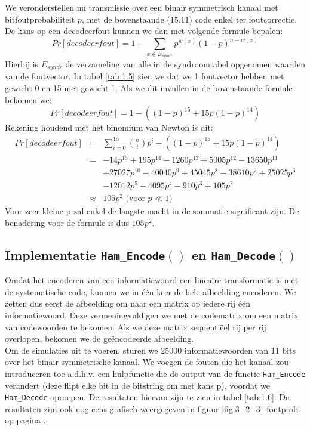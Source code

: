 \documentclass[11pt,a4paper]{article}
\begin{document}
We veronderstellen nu transmissie over een binair symmetrisch kanaal met bitfoutprobabiliteit $p$, met de bovenstaande (15,11) code enkel ter foutcorrectie. De kans op een decodeerfout kunnen we dan met volgende formule bepalen:\\
\begin{equation*}
Pr[decodeerfout] = 1 - \sum_{x \in E_{syndr}} p^{w(x)}(1-p)^{n-w(x)}
\end{equation*} 
Hierbij is $E_{syndr}$ de verzameling van alle in de syndroomtabel opgenomen waarden van de foutvector. In tabel \ref{tab:1.5} zien we dat we 1 foutvector hebben met gewicht 0 en 15 met gewicht 1. Als we dit invullen in de bovenstaande formule bekomen we:
\begin{equation*}
Pr[decodeerfout] = 1 - ((1-p)^{15}+15p(1-p)^{14})
\end{equation*} 
Rekening houdend met het binomium van Newton is dit:
\begin{eqnarray*}
Pr[decodeerfout] &=& \sum_{i=0}^{15} {n \choose i} p^i - ((1-p)^{15}+15p(1-p)^{14})\\
&=& -14p^{15} + 195p^{14} - 1260p^{13} + 5005p^{12} - 13650p^{11}\\
& &	 + 27027p^{10} - 40040p^9 + 45045p^8 - 38610p^7 + 25025p^6 \\
& & - 12012p^5 + 4095p^4 - 910p^3 + 105p^2\\
& \approx & 105p^2 \text{ (voor } p\ll1)
\end{eqnarray*}
Voor zeer kleine p zal enkel de laagste macht in de sommatie significant zijn. De benadering voor de formule is dus $105p^2$.

\subsection{Implementatie \texttt{Ham\_Encode$\left(\right)$} en \texttt{Ham\_Decode$\left(\right)$}}

Omdat het encoderen van een informatiewoord een lineaire transformatie is met de systematische code, kunnen we in \'e\'en keer de hele afbeelding encoderen. We zetten dus eerst de afbeelding om naar een matrix op iedere rij \'e\'en informatiewoord. Deze vermeningvuldigen we met de codematrix om een matrix van codewoorden te bekomen. Als we deze matrix sequenti\"eel rij per rij overlopen, bekomen we de ge\"encodeerde afbeelding. \\

Om de simulaties uit te voeren, sturen we 25000 informatiewoorden van 11 bits over het binair symmetrische kanaal. We voegen de fouten die het kanaal zou introduceren toe a.d.h.v. een hulpfunctie die de output van de functie \texttt{Ham\_Encode} verandert (deze flipt elke bit in de bitstring om met kans p), voordat we \texttt{Ham\_Decode} oproepen. De resultaten hiervan zijn te zien in tabel \ref{tab:1.6}. De resultaten zijn ook nog eens grafisch weergegeven in figuur \ref{fig:3_2_3_foutprob} op pagina \pageref{fig:3_2_3_foutprob}. \\
\end{document}
